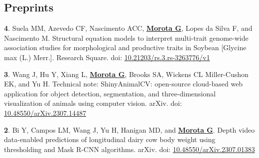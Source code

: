 \documentclass[margin,line,10pt]{res}
\newenvironment{list1}{
  \begin{list}{\ding{113}}{%
      \setlength{\itemsep}{0in}
      \setlength{\parsep}{0in} \setlength{\parskip}{0in}
      \setlength{\topsep}{0in} \setlength{\partopsep}{0in} 
      \setlength{\leftmargin}{0.17in}}}{\end{list}}
\begin{document}
\begin{resume}
\begin{comment}
\begin{list1}



       \vspace{0.5cm}

\item  [{\bf 65}.] Sandhu J, Irvin L, Chandaran AK, Paul P, Dhatt B, Hussain W, Cunningham S, Quinones C, Lorence A, Adviento-Borbe MA, Staswick P, \textbf{\underline{Morota G}}, and Walia H. 2023. Natural variation in {\it LONELY GUY-like 1} regulates rice grain weight under warmer nights.     

    
    \end{list1}
\end{comment}


\vspace{0.5cm}
\section{\sc Preprints}
\begin{list1}

  \item  [{\bf 4}.] Suela MM, Azevedo CF, Nascimento ACC, \textbf{\underline{Morota G}}, Lopes da Silva F, and Nascimento M. Structural equation models to interpret multi-trait genome-wide association studies for morphological and productive traits in Soybean [Glycine max (L.) Merr.].  Research Square. doi: \textcolor{blue}{\href{https://doi.org/10.21203/rs.3.rs-3263776/v1}{10.21203/rs.3.rs-3263776/v1}}


  \vspace{0.5cm}

  \item  [{\bf 3}.] Wang J, Hu Y, Xiang L, \textbf{\underline{Morota G}}, Brooks SA, Wickens CL Miller-Cushon EK, and Yu H. Technical note: ShinyAnimalCV: open-source cloud-based web application for object detection, segmentation, and three-dimensional visualization of animals using computer vision. arXiv. doi: \textcolor{blue}{\href{https://doi.org/10.48550/arXiv.2307.14487}{10.48550/arXiv.2307.14487}}

  \vspace{0.5cm}


  \item  [{\bf 2}.]  Bi Y, Campos LM, Wang J, Yu H, Hanigan MD, and \textbf{\underline{Morota G}}. Depth video data-enabled predictions of longitudinal dairy cow body weight using thresholding and Mask R-CNN algorithms. arXiv. doi: \textcolor{blue}{\href{https://doi.org/10.48550/arXiv.2307.01383}{10.48550/arXiv.2307.01383}}


\end{list1}
\end{resume}
\end{document}
